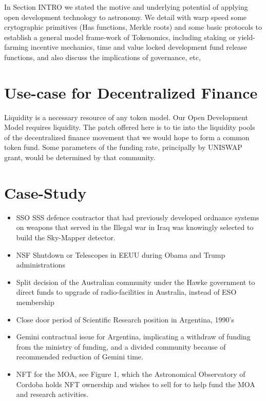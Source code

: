 \documentclass[final,5p,times,twocolumn,authoryear]{elsarticle}
\begin{document}
In Section INTRO we stated the motive and underlying potential of applying open development technology to astronomy. We detail with warp speed some crytographic primitives (Has functions, Merkle roots) and some basic protocols to establish a general model frame-work of Tokenomics, including staking or yield-farming incentive mechanics, time and value locked development fund release functions, and also discuss the implications of governance, etc,

\section{Use-case for Decentralized Finance}
\label{sec:use-case}

Liquidity is a necessary resource of any token model. Our Open Development Model requires liquidity. The patch offered here is to tie into the liquidity pools of the decentralized finance movement that we would hope to form a common token fund. Some parameters of the funding rate, principally by UNISWAP grant, would be determined by that community.   

\section{Case-Study}
\label{sec:btc5}

\begin{itemize}
    \item{SSO SSS defence contractor that had previously developed ordnance systems on weapons that served in the Illegal war in Iraq was knowingly selected to build the Sky-Mapper detector. } 
    \item{NSF Shutdown or Telescopes in EEUU during Obama and Trump administrations}
    \item{Split decision of the Australian community under the Hawke government to direct funds to upgrade of radio-facilities in Australia, instead of ESO membership}
    \item{Close door period of Scientific Research position in Argentina, 1990's}
    \item{Gemini contractual issue for Argentina, implicating a withdraw of funding from the ministry of funding, and a divided community because of recommended reduction of Gemini time.}
    \item{NFT for the MOA}, see Figure 1, which the Astronomical Observatory of Cordoba holds NFT ownership and wishes to sell for to help fund the MOA and research activities. 

\end{itemize}
\end{document}

